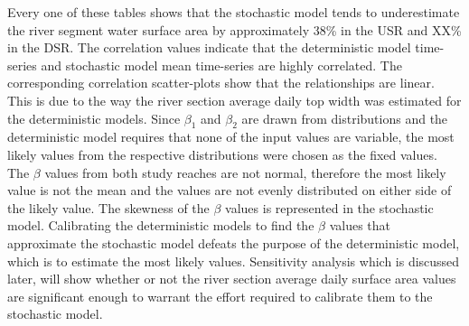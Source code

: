 \begin{linenumbers}
Every one of these tables shows that the stochastic model tends to underestimate the river segment water surface area by approximately 38\% in the USR and XX\% in the DSR.  The correlation values indicate that the deterministic model time-series and stochastic model mean time-series are highly correlated.  The corresponding correlation scatter-plots show that the relationships are linear.  This is due to the way the river section average daily top width was estimated for the deterministic models.  Since $ \beta_1 $ and $ \beta_2 $ are drawn from distributions and the deterministic model requires that none of the input values are variable, the most likely values from the respective distributions were chosen as the fixed values.  The $ \beta $ values from both study reaches are not normal, therefore the most likely value is not the mean and the values are not evenly distributed on either side of the likely value.  The skewness of the $ \beta $ values is represented in the stochastic model.  Calibrating the deterministic models to find the $ \beta $ values that approximate the stochastic model defeats the purpose of the deterministic model, which is to estimate the most likely values.  Sensitivity analysis which is discussed later, will show whether or not the river section average daily surface area values are significant enough to warrant the effort required to calibrate them to the stochastic model.


\end{linenumbers}
